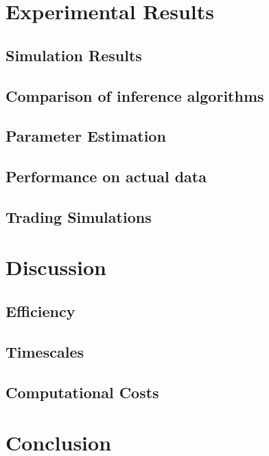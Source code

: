 \documentclass[12pt]{article}
\begin{document}
\section{Experimental Results}

    \subsection{Simulation Results}
    \subsection{Comparison of inference algorithms}
    \subsection{Parameter Estimation}
    \subsection{Performance on actual data}
    \subsection{Trading Simulations}


\section{Discussion}

    \subsection{Efficiency}
    \subsection{Timescales}
    \subsection{Computational Costs}

\section{Conclusion}

\printbibliography[title={References},heading=bibnumbered]
\end{document}
